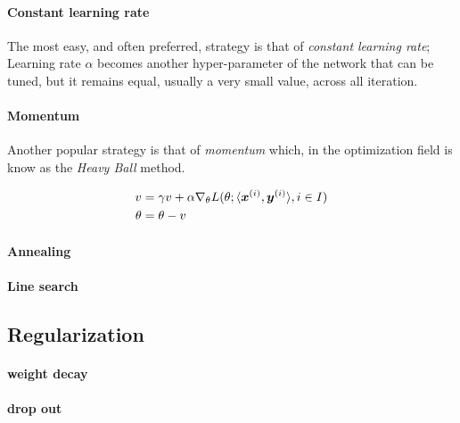 \paragraph{Constant learning rate}
The most easy, and often preferred, strategy is that of \textit{constant learning rate}; Learning rate $\alpha$ becomes another hyper-parameter of the network that can be tuned, but it remains equal, usually a very small value, across all iteration.

\paragraph{Momentum}
Another popular strategy is that of \textit{momentum} which, in the optimization field is know as the \textit{Heavy Ball} method.

\begin{align}
v &= \gamma v+ \alpha \nabla_\theta L(\theta; \langle\boldsymbol{x}^{(i)},\boldsymbol{y}^{(i)}\rangle, i\in I)\\
\theta &= \theta - v
\end{align}

\paragraph{Annealing}
\paragraph{Line search}
\subsection{Regularization}
\paragraph{weight decay}
\paragraph{drop out}


